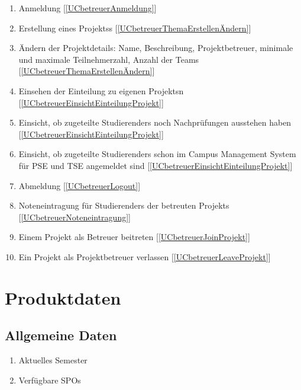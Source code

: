 \documentclass[parskip=full]{scrartcl}
\newcommand{\swtLabel}[1]{\textbf{/#1\arabic*0/}}
\newcommand{\testRef}[1]{[\ref{#1}]}
\begin{document}
\begin{enumerate}[label=\swtLabel{FA}, resume]
  \item Anmeldung  \label{FAbetreuerAnmeldung} \testRef{UCbetreuerAnmeldung}
  \item Erstellung eines \glspl{Projekt}s \label{FAbetreuerAddProjekt}
  \testRef{UCbetreuerThemaErstellenÄndern}
  \item Ändern der \gls{Projektdetails}: Name, Beschreibung, \gls{Projektbetreuer},
        minimale und maximale Teilnehmerzahl, Anzahl der \glspl{Team}
        \label{FAbetreuerChangeProjekt} \testRef{UCbetreuerThemaErstellenÄndern}%
  \item Einsehen der \gls{Einteilung} zu eigenen \glspl{Projekt}n
  \label{FAbetreuerEinsichtEinteilung}
  \testRef{UCbetreuerEinsichtEinteilungProjekt}
  \item Einsicht, ob zugeteilte \glspl{Studierender} noch Nachprüfungen
  ausstehen haben \label{FAbetreuerEinsichtNachpruefung} \testRef{UCbetreuerEinsichtEinteilungProjekt}
  \item Einsicht, ob zugeteilte \glspl{Studierender} schon im Campus Management
  System für \gls{PSE} und \gls{TSE} angemeldet sind
  \label{FAbetreuerEinsichtTSE} \testRef{UCbetreuerEinsichtEinteilungProjekt}
  \item Abmeldung \label{FAbetreuerAbmeldung} \testRef{UCbetreuerLogout}
  \item Noteneintragung für \glspl{Studierender} der betreuten \glspl{Projekt}
  \label{FAbetreuerNoten} \testRef{UCbetreuerNoteneintragung}
  \item Einem \gls{Projekt} als Betreuer beitreten \label{FAbetreuerJoinProjekt}
  \testRef{UCbetreuerJoinProjekt}
  \item Ein \gls{Projekt} als \gls{Projektbetreuer} verlassen \label{FAbetreuerLeaveprojekt}
  \testRef{UCbetreuerLeaveProjekt}

\end{enumerate}



\section{Produktdaten}

\subsection{Allgemeine Daten}
\begin{enumerate}[label=\swtLabel{D}]
  \item Aktuelles Semester
  \item Verfügbare \glspl{SPO}
\end{enumerate}
\end{document}
